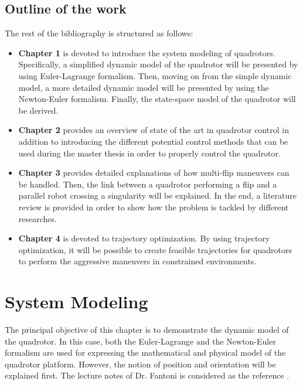 \documentclass{thesisreport}
\begin{document}

\pagebreak

\section*{Outline of the work}

The rest of the bibliography is structured as follows:


\begin{itemize}
\setlength{\itemindent}{-.5in}
	\item [] \textbf{Chapter 1} is devoted to introduce the system modeling of quadrotors. Specifically, a simplified dynamic model of the quadrotor will be presented by using Euler-Lagrange formalism. Then, moving on from the simple dynamic model, a more detailed dynamic model will be presented by using the Newton-Euler formalism. Finally, the state-space model of the quadrotor will be derived.

	\item [] \textbf{Chapter 2} provides an overview of state of the art in quadrotor control in addition to introducing the different potential control methods that can be used during the master thesis in order to properly control the quadrotor. 

	\item [] \textbf{Chapter 3} provides detailed explanations of how multi-flip maneuvers can be handled. Then, the link between a quadrotor performing a flip and a parallel robot crossing a singularity will be explained. In the end, a literature review is provided in order to show how the problem is tackled by different researches.

	\item [] \textbf{Chapter 4} is devoted to trajectory optimization. By using trajectory optimization, it will be possible to create feasible trajectories for quadrotors to perform the aggressive maneuvers in constrained environments.
	
\end{itemize}

\newpage

\chapter{System Modeling}

The principal objective of this chapter is to demonstrate the dynamic model of the quadrotor. In this case, both the Euler-Lagrange and the Newton-Euler formalism are used for expressing the mathematical and physical model of the quadrotor platform. However, the notion of position and orientation will be explained first. The lecture notes of Dr. Fantoni is considered as the reference \cite{Fantoni2016}.
\end{document}
